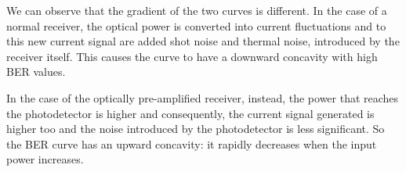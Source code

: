 \documentclass[a4paper,10pt]{report}
\begin{document}
We can observe that the gradient of the two curves is different.
In the case of a normal receiver, the optical power is converted into current fluctuations and to this new current signal
are added shot noise and thermal noise, introduced by the receiver itself. This causes the curve to have a downward concavity with high BER values.

In the case of the optically pre-amplified receiver, instead, the power that reaches the photodetector is higher and consequently,
the current signal generated is higher too and the noise introduced by the photodetector is less significant.
So the BER curve has an upward concavity: it rapidly decreases when the input power increases. 
\end{document}
